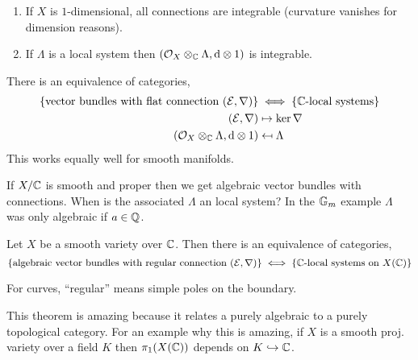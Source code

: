\documentclass[12pt]{article}
\begin{document}
\begin{example}
\begin{enumerate}
\item If $X$ is $1$-dimensional, all connections are integrable (curvature vanishes for dimension reasons).
\item If $\Lambda$ is a local system then $(\mathcal{O}_{X} \otimes_{\mathbb{C}} \Lambda, \mathrm{d} \otimes 1)$ is integrable.
\end{enumerate}
\end{example}

\begin{theorem}
There is an equivalence of categories,
\begin{align*}
\{ \text{vector bundles with flat connection } (\mathcal{E}, \nabla) \} & \iff \{ \mathbb{C}\text{-local systems} \}
\\
(\mathcal{E}, \nabla) & \mapsto \ker{\nabla}
\\
(\mathcal{O}_{X} \otimes_{\mathbb{C}} \Lambda, \mathrm{d} \otimes 1) & \mapsfrom \Lambda
\end{align*}
This works equally well for smooth manifolds.
\end{theorem}

\begin{rmk}
If $X / \mathbb{C}$ is smooth and proper then we get algebraic vector bundles with connections. When is the associated $\Lambda$ an \etale local system? In the $\mathbb{G}_m$ example $\Lambda$ was only algebraic if $a \in \mathbb{Q}$.
\end{rmk}

\begin{thm}[Deligne]
Let $X$ be a smooth variety over $\mathbb{C}$. Then there is an equivalence of categories,
\[ \{ \text{algebraic vector bundles with regular connection } (\mathcal{E}, \nabla) \} \iff \{ \mathbb{C}\text{-local systems on } X(\mathbb{C}) \} \]
\end{thm}

\begin{defn}
For curves, ``regular'' means simple poles on the boundary. 
\end{defn}

\begin{rmk}
This theorem is amazing because it relates a purely algebraic to a purely topological category. For an example why this is amazing, if $X$ is a smooth proj. variety over a field $K$ then $\pi_1(X(\mathbb{C}))$ depends on $K \hookrightarrow \mathbb{C}$. 
\end{rmk}
\end{document}
